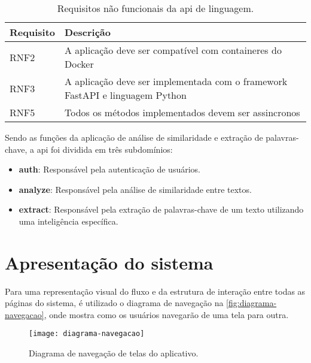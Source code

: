 \begin{table}[H]
  \caption{Requisitos não funcionais da api de linguagem.}
  \label{tab:requisitos_nao_funcionais_linguagem}
  \begin{tabularx}{\textwidth}{l|l}
    \hline
    \textbf{Requisito} & \textbf{Descrição}                                                           \\ \hline
    RNF2               & A aplicação deve ser compatível com containeres do Docker                    \\
    RNF3               & A aplicação deve ser implementada com o framework FastAPI e linguagem Python \\
    RNF5               & Todos os métodos implementados devem ser assincronos                         \\ \hline
  \end{tabularx}
  \fonte{}
\end{table}

Sendo as funções da aplicação de análise de similaridade e extração de palavras-chave, a \gls{api} foi dividida em três subdomínios:

\begin{itemize}
  \item \textbf{auth}: Responsável pela autenticação de usuários.
  \item \textbf{analyze}: Responsável pela análise de similaridade entre textos.
  \item \textbf{extract}: Responsável pela extração de palavras-chave de um texto utilizando uma inteligência específica.
\end{itemize}


\section{Apresentação do sistema}\label{sec:apresentacao}

Para uma representação visual do fluxo e da estrutura de interação entre todas as páginas do sistema, é utilizado o diagrama de navegação na \autoref{fig:diagrama-navegacao}, onde mostra como os usuários navegarão de uma tela para outra.

\begin{figure}[H]
  \captionsetup{width=0.43\textwidth}
  \caption{Diagrama de navegação de telas do aplicativo.}
  \label{fig:diagrama-navegacao}
  \texttt{[image: diagrama-navegacao]}
  \fonte{}
\end{figure}

